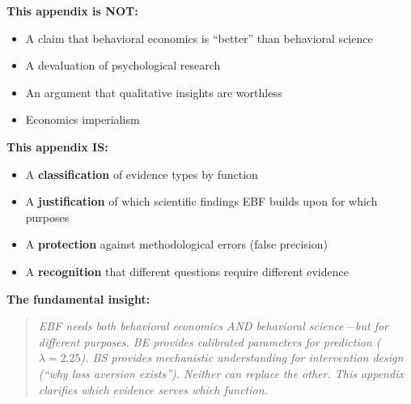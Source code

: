 \documentclass[11pt, a4paper]{article}
\begin{document}
\begin{tcolorbox}[colback=purple!5!white, colframe=purple!75!black,
    title=\textbf{Positioning Statement: What This Appendix Is and Is Not}]

\textbf{This appendix is NOT:}
\begin{itemize}[nosep]
    \item A claim that behavioral economics is ``better'' than behavioral science
    \item A devaluation of psychological research
    \item An argument that qualitative insights are worthless
    \item Economics imperialism
\end{itemize}

\textbf{This appendix IS:}
\begin{itemize}[nosep]
    \item A \textbf{classification} of evidence types by function
    \item A \textbf{justification} of which scientific findings EBF builds upon for which purposes
    \item A \textbf{protection} against methodological errors (false precision)
    \item A \textbf{recognition} that different questions require different evidence
\end{itemize}

\textbf{The fundamental insight:}
\begin{quote}
\textit{EBF needs both behavioral economics AND behavioral science---but for different purposes. BE provides calibrated parameters for prediction ($\lambda = 2.25$). BS provides mechanistic understanding for intervention design (``why loss aversion exists''). Neither can replace the other. This appendix clarifies which evidence serves which function.}
\end{quote}

\end{tcolorbox}


\end{document}
